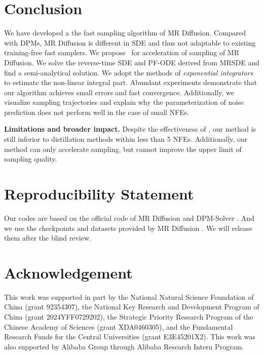 \section{Conclusion}

We have developed a the fast sampling algorithm of MR Diffusion. Compared with DPMs, MR Diffusion is different in SDE and thus not adaptable to existing training-free fast samplers. We propose \ourmethod~for acceleration of sampling of MR Diffusion. We solve the reverse-time SDE
and PF-ODE derived from MRSDE and find a semi-analytical solution. We adopt the methods of \textit{exponential integrators} to estimate the non-linear integral part. Abundant experiments demonstrate that our algorithm achieves small errors and fast convergence. Additionally, we visualize sampling trajectories and explain why the parameterization of noise prediction does not perform well in the case of small NFEs.

\textbf{Limitations and broader impact.} Despite the effectiveness of \ourmethod, our method is still inferior to distillation methods \citep{song2023consistency,luo2023lcm} within less than 5 NFEs. Additionally, our method can only accelerate sampling, but cannot improve the upper limit of sampling quality. 

\section*{Reproducibility Statement}

Our codes are based on the official code of MR Diffusion \citep{luo2023mrsde} and DPM-Solver \citep{lu2022dpmsolverplus}. And we use the checkpoints and datasets provided by MR Diffusion \citep{luo2023mrsde}. We will release them after the blind review.

\section*{Acknowledgement}

This work was supported in part by the National Natural Science Foundation of China (grant 92354307), the National Key Research and Development Program of China (grant 2024YFF0729202), the Strategic Priority Research Program of the Chinese Academy of Sciences (grant XDA0460305), and the Fundamental Research Funds for the Central Universities (grant E3E45201X2). This work was also supported by Alibaba Group through Alibaba Research Intern Program.
\clearpage